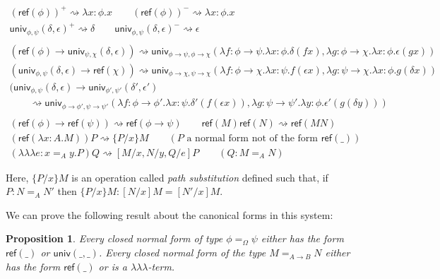 \documentclass{easychair}
\newcommand{\univ}[4]{\mathsf{univ}_{{#1},{#2}} \left( {#3} , {#4} \right)}
\newcommand{\triplelambda}{\lambda \!\! \lambda \!\! \lambda}
\newcommand{\reff}[1]{\mathsf{ref} \left( {#1} \right)}
\newtheorem{proposition}[lemma]{Proposition}
\begin{document}
\begin{gather*}
(\reff{\phi})^+ \rightsquigarrow \lambda x : \phi . x
\qquad
(\reff{\phi})^- \rightsquigarrow \lambda x : \phi . x
\\
\univ{\phi}{\psi}{\delta}{\epsilon}^+ \rightsquigarrow \delta
\qquad
\univ{\phi}{\psi}{\delta}{\epsilon}^- \rightsquigarrow \epsilon
\\ \\
(\reff \phi \rightarrow \univ{\psi}{\chi}{\delta}{\epsilon}) \rightsquigarrow \univ{\phi \rightarrow \psi}{\phi \rightarrow \chi}{\lambda f : \phi \rightarrow \psi . \lambda x : \phi . \delta (f x)}{\lambda g : \phi \rightarrow \chi . \lambda x : \phi . \epsilon (g x)}
\\
(\univ{\phi}{\psi}{\delta}{\epsilon} \rightarrow \reff{\chi}) \rightsquigarrow \univ{\phi \rightarrow \chi}{\psi \rightarrow \chi}{\lambda f : \phi \rightarrow \chi. \lambda x : \psi . f (\epsilon x)}{\lambda g : \psi \rightarrow \chi . \lambda x : \phi . g (\delta x)}
\\
(\univ{\phi}{\psi}{\delta}{\epsilon} \rightarrow \univ{\phi'}{\psi'}{\delta'}{\epsilon'} \hspace{8cm} \\
\qquad \rightsquigarrow \univ{\phi \rightarrow \phi'}{\psi \rightarrow \psi'}
{\lambda f : \phi \rightarrow \phi' . \lambda x : \psi . \delta' (f (\epsilon x))}{\lambda g : \psi \rightarrow \psi' . \lambda y : \phi . \epsilon' (g (\delta y))}
\\ \\
(\reff{\phi} \rightarrow \reff{\psi}) \rightsquigarrow \reff{\phi \rightarrow \psi}
\qquad
\reff{M} \reff{N} \rightsquigarrow \reff{MN}
\\
(\reff{\lambda x:A.M})P \rightsquigarrow \{ P / x \} M \qquad (P \text{ a normal form not of the form } \reff{\_})
\\
(\triplelambda e : x =_A y.P)Q \rightsquigarrow [M/x, N/y, Q/e]P \qquad (Q : M =_A N)
\end{gather*}

Here, $\{ P / x \}M$ is an operation called \emph{path substitution} defined such that, if $P : N =_A N'$ then $\{ P / x \} M : [N/x]M = [N'/x]M$.

We can prove the following result about the canonical forms in this system:

\begin{proposition}
Every closed normal form of type $\phi =_\Omega \psi$ either has the form $\reff{\_}$ or $\mathsf{univ}(\_,\_)$.  Every closed normal form of the type $M =_{A \rightarrow B} N$ either has the form $\reff{\_}$ or is a $\triplelambda$-term.
\end{proposition}
\end{document}
